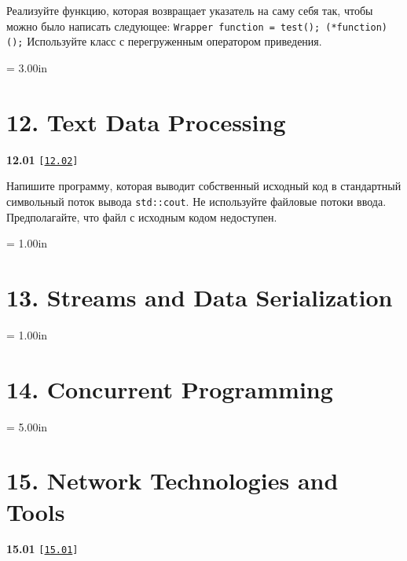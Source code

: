 \documentclass[a4paper,12pt]{article}
\begin{document}
\bigskip

Реализуйте функцию, которая возвращает указатель на саму себя так, чтобы можно было написать следующее: \lstinline{Wrapper function = test(); (*function)();} Используйте класс с перегруженным оператором приведения.



\newpage\thispagestyle{empty}\pdfpageheight = 3.00in\enlargethispage{100in}

\section{12. Text Data Processing}

{\large \textbf{12.01} \texttt{[\href{https://github.com/i-s-m-mipt/Education/blob/master/projects/examples/source/12.02.cpp}{\texttt{12.02}}]}}

\bigskip

Напишите программу, которая выводит собственный исходный код в стандартный символьный поток вывода \lstinline{std::cout}. Не используйте файловые потоки ввода. Предполагайте, что файл с исходным кодом недоступен.



\newpage\thispagestyle{empty}\pdfpageheight = 1.00in\enlargethispage{100in}

\section{13. Streams and Data Serialization}



\newpage\thispagestyle{empty}\pdfpageheight = 1.00in\enlargethispage{100in}

\section{14. Concurrent Programming}



\newpage\thispagestyle{empty}\pdfpageheight = 5.00in\enlargethispage{100in}

\section{15. Network Technologies and Tools}

{\large \textbf{15.01} \texttt{[\href{https://github.com/i-s-m-mipt/Education/blob/master/projects/examples/source/15.01.cpp}{\texttt{15.01}}]}}

\bigskip
\end{document}
